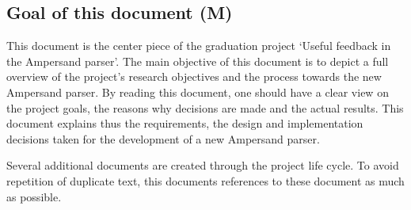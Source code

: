 
\subsection{Goal of this document (M)}
This document is the center piece of the graduation project `Useful feedback in the Ampersand parser'.
The main objective of this document is to depict a full overview of the project's research objectives and the process towards the new Ampersand parser.
By reading this document, one should have a clear view on the project goals, the reasons why decisions are made and the actual results.
This document explains thus the requirements, the design and implementation decisions taken for the development of a new Ampersand parser.

Several additional documents are created through the project life cycle.
To avoid repetition of duplicate text, this documents references to these document as much as possible.
